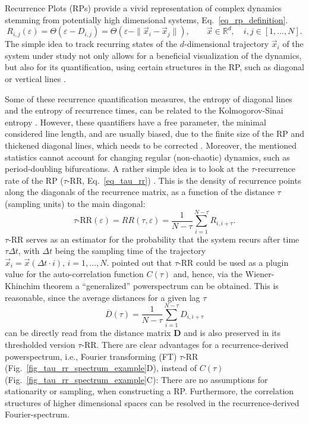 Recurrence Plots (RPs) provide a vivid representation of complex dynamics stemming from potentially high dimensional systems, Eq.~\eqref{eq_rp_definition}. 
\begin{equation}\label{eq_rp_definition}
R_{i,j}(\varepsilon) = \Theta\left(\varepsilon - D_{i,j}\right) 
= \Theta\left(\varepsilon - \| \vec{x}_i - \vec{x}_j\|\right), \qquad \vec{x} \in \mathbb{R}^d, \quad i,j \in [1,\ldots, N].
\end{equation}
The simple idea to 
track recurring states of the $d$-dimensional trajectory $\vec{x}_i$ of the system under study not only allows for a beneficial visualization of the dynamics, but also for its 
quantification, using certain structures in the RP, such as diagonal or vertical lines \cite{marwan2007}. 

Some of these recurrence quantification measures, the entropy of diagonal lines and the entropy of 
recurrence times, can be related to the Kolmogorov-Sinai entropy \cite{march2005,baptista2010}. However, these quantifiers have a free parameter, the minimal considered line length, and 
are usually biased, due to the finite size of the RP and thickened diagonal lines, which needs to be corrected \cite{Kraemer2019}. Moreover, the mentioned statistics cannot account for 
changing regular (non-chaotic) dynamics, such as period-doubling bifurcations.
A rather simple idea is to look at the $\tau$-recurrence rate of the RP ($\tau$-RR, Eq.~\ref{eq_tau_rr}) \cite{marwan2002pla,Zbilut2008}.
This is the density of recurrence points along the diagonals of the recurrence matrix, as a function of the distance $\tau$ (sampling units) to the main diagonal:
\begin{equation}\label{eq_tau_rr}
\tau\text{-RR}(\varepsilon) = RR(\tau, \varepsilon) = \frac{1}{N-\tau} \sum_{i=1}^{N-\tau	} R_{i,i+\tau}.
\end{equation}
$\tau$-RR serves as an estimator for the probability that the system recurs after time $\tau \Delta t$, with $\Delta t$ being the sampling time of the trajectory 
$\vec{x}_i = \vec{x}(\Delta t \cdot i),\, i=1,\ldots,N$. 
\citet{Zbilut2008} pointed out that $\tau$-RR could be used as a plugin value for the auto-correlation function $C(\tau)$ and, hence, via the Wiener-Khinchim theorem a 
``generalized'' powerspectrum can be obtained. This is reasonable, since the average distances for a given lag $\tau$ 
\begin{equation}
\overline{D}(\tau) = \frac{1}{N-\tau}\sum_{i=1}^{N-\tau} D_{i, i+\tau}
\end{equation}
can be directly read from the distance matrix $\mathbf{D}$ and is also preserved in its thresholded version $\tau$-RR. There are clear advantages for a recurrence-derived 
powerspectrum, i.e., Fourier transforming (FT) $\tau$-RR (Fig.~\ref{fig_tau_rr_spectrum_example}D), instead 
of $C(\tau)$ (Fig.~\ref{fig_tau_rr_spectrum_example}C): There are no assumptions for stationarity or sampling, when constructing a RP.
Furthermore, the correlation structures of higher dimensional spaces can be resolved in the recurrence-derived Fourier-spectrum.\\

